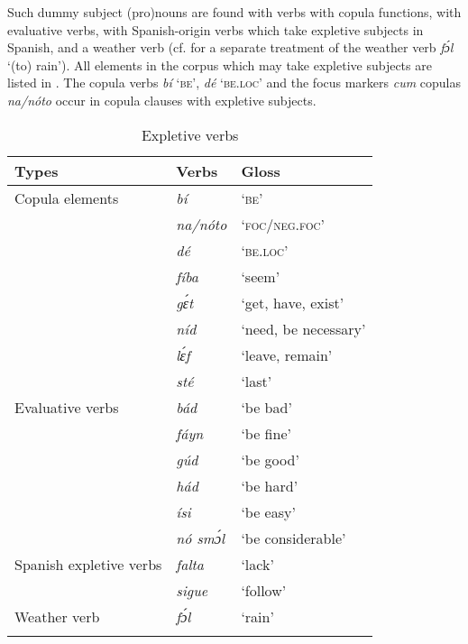 Such dummy subject (pro)nouns are found with verbs with copula functions, with evaluative verbs, with Spanish-origin verbs which take expletive subjects in Spanish, and a weather verb (cf.  for a separate treatment of the weather verb \textit{fɔ́l} ‘(to) rain’). All elements in the corpus which may take expletive subjects are listed in . The copula verbs \textit{bí} \textsc{‘be’,} \textit{dé} \textsc{‘be.loc’} and the focus markers \textit{cum} copulas \textit{na/nóto} occur in copula clauses with expletive subjects.


\begin{table}
\caption{Expletive verbs}
\label{tab:key:9.6}

\begin{tabularx}{\textwidth}{XXX}
\lsptoprule

Types & Verbs & Gloss\\
\midrule
Copula elements & \itshape \textit{bí} & ‘\textsc{be’}\\
& \itshape \textit{na/nóto}  & \textsc{‘foc/neg.foc’}\\
& \itshape \textit{dé}  & \textsc{‘be.loc’}\\
& \itshape \textit{fíba} & ‘seem’\\
& \itshape gɛ́t & ‘get, have, exist’\\
& \itshape \textit{níd} & ‘need, be necessary’\\
& \itshape lɛ́f & ‘leave, remain’\\
& \itshape \textit{sté} & ‘last’\\
\tablevspace
Evaluative verbs & \itshape \textit{bád} & ‘be bad’\\
& \itshape \textit{fáyn} & ‘be fine’\\
& \itshape \textit{gúd} & ‘be good’\\
& \itshape \textit{hád} & ‘be hard’\\
& \itshape \textit{ísi} & ‘be easy’\\
& \itshape \textit{nó smɔ́l} & ‘be considerable’\\
\tablevspace
Spanish expletive verbs & \itshape \textit{falta} & ‘lack’\\
& \itshape \textit{sigue} & ‘follow’\\
\tablevspace
Weather verb & \itshape \textit{fɔ́l} & ‘rain’\\
\lspbottomrule
\end{tabularx}
\end{table}
 


